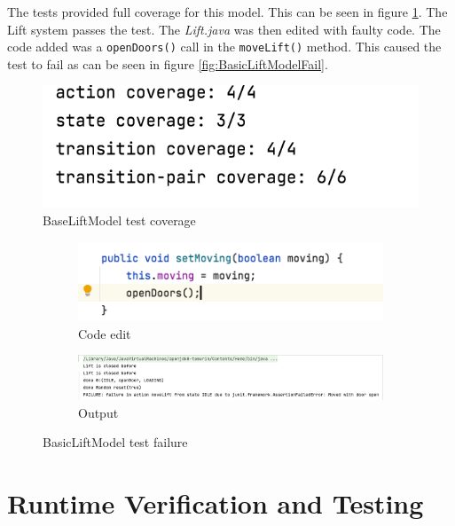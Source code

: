 \documentclass[a4paper, 12pt]{article}
\begin{document}
The tests provided full coverage for this model. This can be seen in figure \ref{fig:BaseLiftModel-coverage}. The Lift system passes the test. The \textit{Lift.java} was then edited with faulty code. The code added was a \texttt{openDoors()} call in the \texttt{moveLift()} method. This caused the test to fail as can be seen in figure \ref{fig:BasicLiftModelFail}.

\begin{figure}[h]
   \centering
   \includegraphics[width=\textwidth,height=\textheight,keepaspectratio]{images/BaseLiftModel-coverage} %
   \caption{BaseLiftModel test coverage}
   \label{fig:BaseLiftModel-coverage}
\end{figure}

\begin{figure}
\centering
\begin{subfigure}{.5\textwidth}
  \centering
  \includegraphics[width=\linewidth]{images/BasicLiftModel-fail-code}
  \caption{Code edit}
\end{subfigure}%
\begin{subfigure}{.5\textwidth}
  \centering
  \includegraphics[width=\linewidth]{images/BasicLiftModel-fail-output}
  \caption{Output}
\end{subfigure}
\caption{BasicLiftModel test failure}
\label{fig:BasicLiftModel-fail}
\end{figure}


\section{Runtime Verification and Testing}


 
\end{document}
